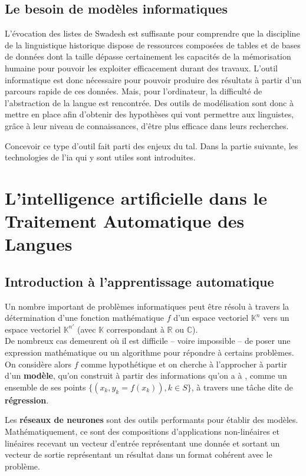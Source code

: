 \documentclass[12pt, twoside]{report}
\begin{document}
\subsection{Le besoin de modèles informatiques}

L'évocation des listes de Swadesh est suffisante pour comprendre que la discipline de la linguistique historique dispose de ressources composées de tables et de bases de données dont la taille dépasse certainement les capacités de la mémorisation humaine pour pouvoir les exploiter efficacement durant des travaux. L'outil informatique est donc nécessaire pour pouvoir produire des résultats à partir d'un parcours rapide de ces données. Mais, pour l'ordinateur, la difficulté de l'abstraction de la langue est rencontrée. Des outils de modélisation sont donc à mettre en place afin d'obtenir des hypothèses qui vont permettre aux linguistes, grâce à leur niveau de connaissances, d'être plus efficace dans leurs recherches.

Concevoir ce type d'outil fait parti des enjeux du \Gls{tal}. Dans la partie suivante, les technologies de l'\Gls{ia} qui y sont utiles sont introduites.

\section{L'intelligence artificielle dans le Traitement Automatique des Langues}
\subsection{Introduction à l'apprentissage automatique}

Un nombre important de problèmes informatiques peut être résolu à travers la détermination d'une fonction mathématique $f$ d'un espace vectoriel $\mathbb{K}^n$ vers un espace vectoriel $\mathbb{K}^{n'}$ (avec $\mathbb{K}$ correspondant à $\mathbb{R}$ ou $\mathbb{C}$).\\
De nombreux cas demeurent où il est difficile -- voire impossible -- de poser une expression mathématique ou un algorithme pour répondre à certains problèmes. On considère alors $f$ comme hypothétique et on cherche à l'approcher à partir d'un \textbf{modèle}, qu'on construit à partir des informations qu'on a à     , comme un ensemble de ses points $\{(x_k, y_k=f(x_k)), k \in S\}$, à travers une tâche dite de \textbf{régression}.

\vspace{12pt}
Les \textbf{réseaux de neurones} sont des outils performants pour établir des modèles. Mathématiquement, ce sont des compositions d'applications non-linéaires et linéaires recevant un vecteur d'entrée représentant une donnée et sortant un vecteur de sortie représentant un résultat dans un format cohérent avec le problème.
\end{document}
